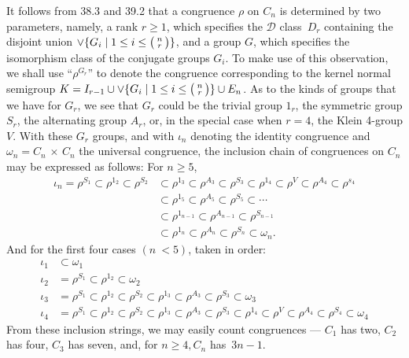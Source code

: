 \documentclass{surv-l}
\numberwithin{equation}{section}
\numberwithin{table}{section}
\numberwithin{figure}{section}
\theoremstyle{plain}
\theoremstyle{definition}
\begin{document}
It follows from 38.3 and 39.2 that a congruence $\rho$ on $C_{n}$
is determined by two parameters, namely, a rank $r\geq 1$, which
specifies the $\mathcal{D}$ class~$D_{r}$ containing the disjoint
union $\vee \{G_{i}\mid 1 \leq i\leq\big(\kern0.5pt\begin{smallmatrix}
n\\
r \end{smallmatrix}\kern0.5pt\big)\}$, and a group $G$, which specifies
the isomorphism class of the conjugate groups $G_{i}$. To make use
of this observation, we shall use ``$\rho^{G_{r}}$'' to denote the
congruence corresponding to the kernel normal semigroup $K=I_{r-1}
\cup \vee \{G_{i}\mid 1\leq i\leq\big(\kern0.5pt\begin{smallmatrix}
n\\
r \end{smallmatrix}\kern0.5pt\big)\}\cup E_{n}$. As to the kinds of groups
that we have for $G_{r}$, we see that $G_{r}$ could be the trivial
group $1_{r}$, the symmetric group $S_{r}$, the alternating group
$A_{r}$, or, in the special case when $r=4$, the Klein 4-group
$V$. With these $G_{r}$ groups, and with $\iota_{n}$ denoting the
identity congruence and $\omega_{n}=C_{n}\,\times\, C_{n}$ the
universal congruence, the inclusion chain of congruences on
$C_{n}$ may be expressed as follows: For $n \geq 5$,
\begin{align*}
\iota_{n}=\rho^{S_{1}}\subset\rho^{1_{2}}\subset\rho^{S_{2}}&\subset\rho^{1_{3}}\subset\rho^{A_{3}}\subset\rho^{S_{3}}\subset\rho^{1_{4}}\subset\rho^{V}\subset\rho^{A_{4}}\subset\rho^{s_{4}} \\
&\subset\rho^{1_{5}}\subset\rho^{A_{5}}\subset\rho^{S_{5}}\subset\cdots \\
&\subset\rho^{1_{n-1}}\subset\rho^{A_{n-1}}\subset\rho^{S_{n-1}} \\
&\subset\rho^{1_{n}}\subset\rho^{A_{n}}\subset\rho^{S_{n}}\subset\omega_{n}.
\end{align*}
And for the first four cases $(n\ <5)$, taken in order:
\begin{align*}
\iota_{1}&\subset\omega_{1} \\
\iota_{2} &=\rho^{S_{1}}\subset\rho^{1_{2}}\subset\omega_{2} \\
\iota_{3}&=\rho^{S_{1}}\subset\rho^{1_{2}}\subset\rho^{S_{2}}\subset\rho^{1_{3}}\subset\rho^{A_{3}}\subset\rho^{S_{3}}\subset\omega_{3} \\
\iota_{4} &=\rho^{S_{1}}\subset\rho^{1_{2}}\subset\rho^{S_{2}}\subset\rho^{1_{3}}\subset\rho^{A_{3}}\subset\rho^{S_{3}}\subset\rho^{1_{4}}\subset\rho^{V}\subset\rho^{A_{4}}\subset\rho^{S_{4}}\subset\omega_{4}
\end{align*}
From these inclusion strings, we may easily count congruences
--- $C_{1}$ has two, $C_{2}$ has four, $C_{3}$ has seven, and, for
$n \geq 4, C_{n}$ has~$3n -1$.
\end{document}

